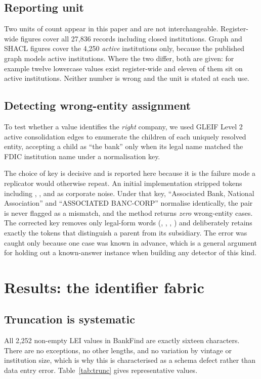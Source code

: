 \documentclass[11pt]{article}
\begin{document}
\subsection{Reporting unit}
\label{sec:unit}
Two units of count appear in this paper and are not interchangeable. Register-wide figures cover all 27,836 records including closed institutions. Graph and SHACL figures cover the 4,250 \emph{active} institutions only, because the published graph models active institutions. Where the two differ, both are given: for example twelve lowercase values exist register-wide and eleven of them sit on active institutions. Neither number is wrong and the unit is stated at each use.

\subsection{Detecting wrong-entity assignment}
\label{sec:method-parent}
To test whether a value identifies the \emph{right} company, we used GLEIF Level 2 active consolidation edges to enumerate the children of each uniquely resolved entity, accepting a child as ``the bank'' only when its legal name matched the FDIC institution name under a normalisation key.

The choice of key is decisive and is reported here because it is the failure mode a replicator would otherwise repeat. An initial implementation stripped tokens including , ,  and  as corporate noise. Under that key, ``Associated Bank, National Association'' and ``ASSOCIATED BANC-CORP'' normalise identically, the pair is never flagged as a mismatch, and the method returns \emph{zero} wrong-entity cases. The corrected key removes only legal-form words (, , , ) and deliberately retains exactly the tokens that distinguish a parent from its subsidiary. The error was caught only because one case was known in advance, which is a general argument for holding out a known-answer instance when building any detector of this kind.

\section{Results: the identifier fabric}
\label{sec:fdic}

\subsection{Truncation is systematic}
All 2,252 non-empty LEI values in BankFind are exactly sixteen characters. There are no exceptions, no other lengths, and no variation by vintage or institution size, which is why this is characterised as a schema defect rather than data entry error. Table~\ref{tab:trunc} gives representative values.
\end{document}
